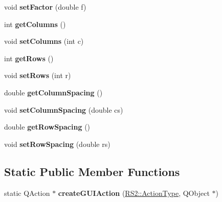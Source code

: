 \begin{DoxyCompactItemize}
\item 
\hypertarget{classRS__ActionBlocksInsert_a3693b272115647b2dbc1f636e5c489a4}{void {\bfseries set\-Factor} (double f)}\label{classRS__ActionBlocksInsert_a3693b272115647b2dbc1f636e5c489a4}

\item 
\hypertarget{classRS__ActionBlocksInsert_a9f0d6c3768d1877d9c708125015f8a0b}{int {\bfseries get\-Columns} ()}\label{classRS__ActionBlocksInsert_a9f0d6c3768d1877d9c708125015f8a0b}

\item 
\hypertarget{classRS__ActionBlocksInsert_a2157c7a025f3ff4f706540475f4efc95}{void {\bfseries set\-Columns} (int c)}\label{classRS__ActionBlocksInsert_a2157c7a025f3ff4f706540475f4efc95}

\item 
\hypertarget{classRS__ActionBlocksInsert_a21d7ae048011cb7f5dcff2613a3c0389}{int {\bfseries get\-Rows} ()}\label{classRS__ActionBlocksInsert_a21d7ae048011cb7f5dcff2613a3c0389}

\item 
\hypertarget{classRS__ActionBlocksInsert_a70ace1ad4ee289bde8881ad8ed9a58db}{void {\bfseries set\-Rows} (int r)}\label{classRS__ActionBlocksInsert_a70ace1ad4ee289bde8881ad8ed9a58db}

\item 
\hypertarget{classRS__ActionBlocksInsert_ad225e82819b73ba518367f841b1dcc97}{double {\bfseries get\-Column\-Spacing} ()}\label{classRS__ActionBlocksInsert_ad225e82819b73ba518367f841b1dcc97}

\item 
\hypertarget{classRS__ActionBlocksInsert_aaf69d9459156a1470579b943ceba2ce1}{void {\bfseries set\-Column\-Spacing} (double cs)}\label{classRS__ActionBlocksInsert_aaf69d9459156a1470579b943ceba2ce1}

\item 
\hypertarget{classRS__ActionBlocksInsert_ae78ff42878b6df8a8ecc5c0e75b837ce}{double {\bfseries get\-Row\-Spacing} ()}\label{classRS__ActionBlocksInsert_ae78ff42878b6df8a8ecc5c0e75b837ce}

\item 
\hypertarget{classRS__ActionBlocksInsert_aae1c288f51ee62ab152faa0d9d3811f3}{void {\bfseries set\-Row\-Spacing} (double rs)}\label{classRS__ActionBlocksInsert_aae1c288f51ee62ab152faa0d9d3811f3}

\end{DoxyCompactItemize}
\subsection*{Static Public Member Functions}
\begin{DoxyCompactItemize}
\item 
\hypertarget{classRS__ActionBlocksInsert_a57aa672ac6a2354fd90b373213c91d07}{static Q\-Action $\ast$ {\bfseries create\-G\-U\-I\-Action} (\hyperlink{classRS2_afe3523e0bc41fd637b892321cfc4b9d7}{R\-S2\-::\-Action\-Type}, Q\-Object $\ast$)}\label{classRS__ActionBlocksInsert_a57aa672ac6a2354fd90b373213c91d07}

\end{DoxyCompactItemize}
